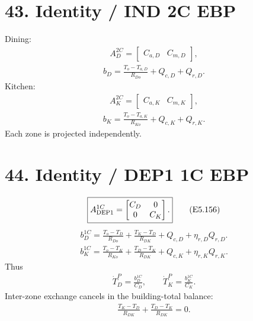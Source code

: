 \documentclass[11pt]{article}
\begin{document}
\section*{43. Identity / IND 2C EBP}

Dining:
\begin{align}
\boxed{A_D^{2C}=\begin{bmatrix}C_{a,D}&C_{m,D}\end{bmatrix},}
\tag{E5.152}
\end{align}
\begin{align}
\boxed{b_D=\frac{T_o-T_{a,D}}{R_{Do}}+Q_{c,D}+Q_{r,D}.}
\tag{E5.153}
\end{align}
Kitchen:
\begin{align}
\boxed{A_K^{2C}=\begin{bmatrix}C_{a,K}&C_{m,K}\end{bmatrix},}
\tag{E5.154}
\end{align}
\begin{align}
\boxed{b_K=\frac{T_o-T_{a,K}}{R_{Ko}}+Q_{c,K}+Q_{r,K}.}
\tag{E5.155}
\end{align}
Each zone is projected independently.

\section*{44. Identity / DEP1 1C EBP}

\begin{align}
\boxed{A_{\rm DEP1}^{1C}=\begin{bmatrix}C_D&0\\0&C_K\end{bmatrix}.}
\tag{E5.156}
\end{align}
\begin{align}
\boxed{b_D^{1C}=\frac{T_o-T_D}{R_{Do}}+\frac{T_K-T_D}{R_{DK}}+Q_{c,D}+\eta_{r,D}Q_{r,D}.}
\tag{E5.157}
\end{align}
\begin{align}
\boxed{b_K^{1C}=\frac{T_o-T_K}{R_{Ko}}+\frac{T_D-T_K}{R_{DK}}+Q_{c,K}+\eta_{r,K}Q_{r,K}.}
\tag{E5.158}
\end{align}
Thus
\begin{align}
\boxed{\dot T_D^P=\frac{b_D^{1C}}{C_D},\qquad \dot T_K^P=\frac{b_K^{1C}}{C_K}.}
\tag{E5.159}
\end{align}
Inter-zone exchange cancels in the building-total balance:
\begin{align}
\boxed{\frac{T_K-T_D}{R_{DK}}+\frac{T_D-T_K}{R_{DK}}=0.}
\tag{E5.160}
\end{align}
\end{document}
